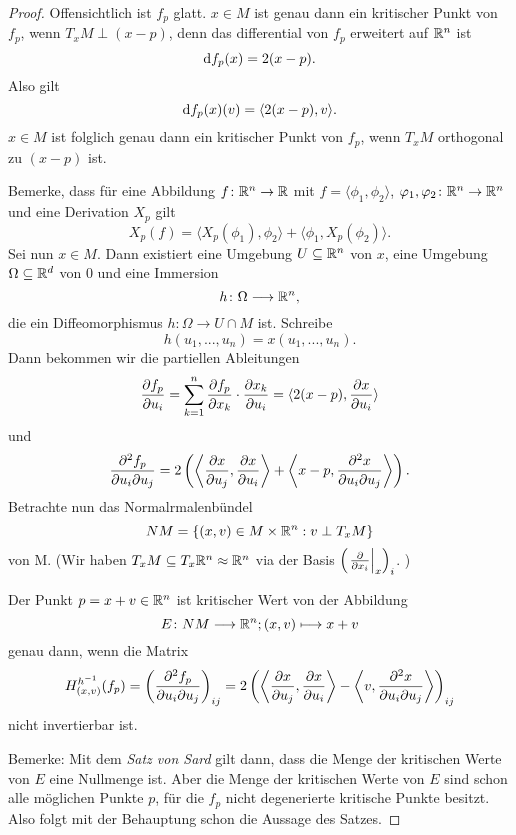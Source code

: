 \begin{proof}
    Offensichtlich ist $f_p$ glatt. $x \in M$ ist genau dann ein kritischer Punkt von $f_p$, wenn
    $T_xM \perp (x - p)$, denn das differential von $f_p$ erweitert auf $\R^n$ ist
    \[ \opd f_p (x) = 2 (x - p). \]
    Also gilt
    \[ \opd f_p (x) (v) = \langle 2 (x - p), v \rangle . \]
    $x \in M$ ist folglich genau dann ein kritischer Punkt von $f_p$, wenn $T_xM$ orthogonal 
    zu $(x - p)$ ist.

    Bemerke, dass für eine Abbildung $f \colon \R^n \to \R$ mit $f = \langle \phi_1, \phi_2 \rangle$,
    $\phi_1, \phi_2 \colon \R^n \to \R^n$ und eine Derivation $X_p$ gilt 
    \[ X_p (f) = \langle X_p(\phi_1), \phi_2 \rangle + \langle \phi_1, X_p(\phi_2) \rangle.  \]
    Sei nun $x \in M$. Dann existiert eine Umgebung $U \subseteq \R^n$ von $x$, eine Umgebung 
    $\Omega \subseteq \R^d$ von $0$ und eine Immersion 
    \[ h \colon \Omega \longto \R^n , \]
    die ein Diffeomorphismus $h \colon \Omega \to U \cap M$ ist.
    Schreibe
    \[ h(u_1, ..., u_n) = x(u_1, ..., u_n). \]
    Dann bekommen wir die partiellen Ableitungen
    \[ 
        \pderive[f_p]{u_i} = \sum_{k = 1}^n \pderive[f_p]{x_k} \cdot \pderive[x_k]{u_i} 
        = \langle 2(x - p), \pderive[x]{u_i} \rangle 
    \]
    und 
    \[ 
        \pdderive[f_p]{u_i}{u_j} = 
            2 \left( \left\langle \pderive[x]{u_j}, \pderive[x]{u_i} \right\rangle + 
            \left\langle x - p , \pdderive[x]{u_i}{u_j} \right\rangle \right) 
    . \]
    Betrachte nun das Normalrmalenbündel
    \[ NM = \{ (x, v) \in M \times \R^n : v \perp T_xM \} \]
    von M. 
    (Wir haben $T_xM \subseteq T_x\R^n \approx \R^n$ via der Basis 
    $\left( \left. \pderive{x_i} \right|_x \right)_i$. )
    \begin{claim*}
        Der Punkt $p = x + v \in \R^n$ ist kritischer Wert von der Abbildung 
        \[ E \colon NM \longto \R^n ; (x, v) \longmapsto x + v \]
        genau dann, wenn die Matrix
        \[
            H_{(x, v)}^{h^{-1}} (f_p)
            = \left( \pdderive[f_p]{u_i}{u_j} \right)_{ij}
            = 2 \left( \left\langle \pderive[x]{u_j}, \pderive[x]{u_i} \right\rangle - 
            \left\langle v , \pdderive[x]{u_i}{u_j} \right\rangle \right)_{ij}
        \]
        nicht invertierbar ist.
    \end{claim*}

    Bemerke: Mit dem \textit{Satz von Sard} gilt dann, dass die Menge der kritischen Werte von 
    $E$ eine Nullmenge ist. Aber die Menge der kritischen Werte von $E$ sind schon alle möglichen
    Punkte $p$, für die $f_p$ nicht degenerierte kritische Punkte besitzt. Also folgt mit der 
    Behauptung schon die Aussage des Satzes.


\end{proof}
